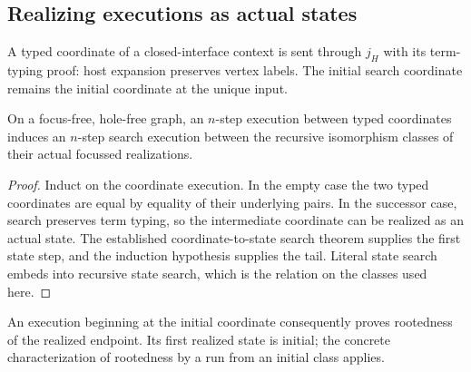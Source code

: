 \subsection{Realizing executions as actual states}
A typed coordinate of a closed-interface context is sent through $j_H$ with its
term-typing proof: host expansion preserves vertex labels. The initial search
coordinate remains the initial coordinate at the unique input.
\begin{theorem}
On a focus-free, hole-free graph, an $n$-step execution between typed coordinates
induces an $n$-step search execution between the recursive isomorphism classes
of their actual focussed realizations.
\end{theorem}
\begin{proof}
Induct on the coordinate execution. In the empty case the two typed coordinates
are equal by equality of their underlying pairs. In the successor case, search
preserves term typing, so the intermediate coordinate can be realized as an
actual state. The established coordinate-to-state search theorem supplies the
first state step, and the induction hypothesis supplies the tail. Literal
state search embeds into recursive state search, which is the relation on the
classes used here.
\end{proof}
An execution beginning at the initial coordinate consequently proves rootedness
of the realized endpoint. Its first realized state is initial; the concrete
characterization of rootedness by a run from an initial class applies.


